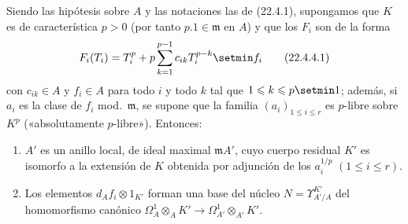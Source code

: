 \begin{proposition}[22.4.4]
\label{0.22.4.4-fr}
Siendo las hipótesis sobre $A$ y las notaciones las de \textup{(22.4.1)}, supongamos
que $K$ es de característica $p>0$ (por tanto $p.1\in\mathfrak m$ en
$A$) y que los $F_i$ son de la forma
\begin{equation}
\label{0.22.4.4.1-fr}
  F_i(T_i)=T_i^p+p\sum_{k=1}^{p-1}c_{ik}T_i^{p-k}\setmin f_i
  \tag{22.4.4.1}
\end{equation}
con $c_{ik}\in A$ y $f_i\in A$ para todo $i$ y todo $k$ tal que
$1\leqslant k\leqslant p\setmin 1$; además, si $a_i$ es la clase de $f_i$
\textup{mod.}~$\mathfrak m$, se supone que la familia $(a_i)_{1\leqslant i\leqslant r}$
es $p$-libre sobre $K^p$ \textup{(«absolutamente $p$-libre»)}. Entonces:
\begin{enumerate}
  \item[\textup{(i)}] $A'$ es un anillo local, de ideal maximal $\mathfrak mA'$,
  cuyo cuerpo residual $K'$ es isomorfo a la extensión de $K$ obtenida por
  adjunción de los $a_i^{1/p}$ $(1\leqslant i\leqslant r)$.


  \item[\textup{(ii)}] Los elementos $d_Af_i\otimes1_{K'}$ forman una base del núcleo
  $N=\Upsilon^{K'}_{A'/A}$ del homomorfismo canónico
  $\Omega^1_A\otimes_AK'\longrightarrow\Omega^1_{A'}\otimes_{A'}K'$.
\end{enumerate}
\end{proposition}

